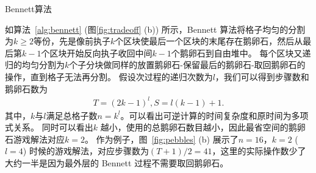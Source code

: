 \documentclass[A4,twoside,UTF8]{ctexart}
\begin{document}
\begin{algorithm}
    \SetAlgoLined
    \DontPrintSemicolon
    \caption{Bennett算法}\label{alg:bennett}
\end{algorithm}
如算法~\ref{alg:bennett} (图\ref{fig:tradeoff} (b)) 所示，Bennett 算法将格子均匀的分割为$k\geq 2$等份，先是像前执子$k$个区块使最后一个区块的末尾存在鹅卵石，然后从最后第$k-1$个区块开始反向执子收回中间$k-1$个鹅卵石到自由堆中。
每个区块又递归的均匀分割为$k$个子分块做同样的放置鹅卵石-保留最后的鹅卵石-取回鹅卵石的操作，直到格子无法再分割。
假设次过程的递归次数为$l$，我们可以得到步骤数和鹅卵石数为
\begin{align}\label{eq:rev}
    T = (2k-1)^l, S = l(k-1)+1.
\end{align}
其中，$k$与$l$满足总格子数$n = k^l$。可以看出可逆计算的时间复杂度和原时间为多项式关系。
同时可以看出$k$ 越小，使用的总鹅卵石数目越小，因此最省空间的鹅卵石游戏解法对应$k=2$。
作为例子，图~\ref{fig:pebbles} (b) 展示了$n=16$，$k=2$ ($l=4$) 时候的游戏解法，对应步骤数为$(T+1)/2 = 41$，这里的实际操作数少了大约一半是因为最外层的 Bennett 过程不需要取回鹅卵石。
\end{document}
